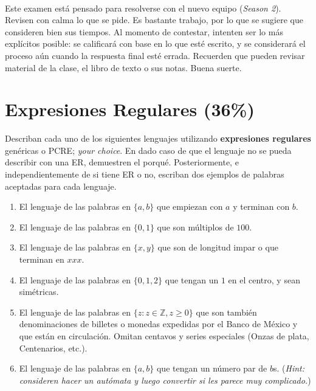 \documentclass[8pt, onside]{article}
\title{
    \myclass \\
    \textbf{\mytitle} \\
    \myheader
    \date{}
}
\begin{document}
\maketitle

\vspace{-1.5cm}

Este examen está pensado para resolverse con el nuevo equipo (\textit{Season 2}).
Revisen con calma lo que se pide. Es bastante trabajo, por lo que se sugiere que consideren bien sus tiempos.
Al momento de contestar, intenten ser lo más explícitos posible: se calificará con base en lo que esté escrito, y se considerará el proceso aún cuando la respuesta final esté errada.
Recuerden que pueden revisar material de la clase, el libro de texto o sus notas.
Buena suerte.

\section{Expresiones Regulares (36\%)}

Describan cada uno de los siguientes lenguajes utilizando \textbf{expresiones regulares} genéricas o PCRE; \textit{your choice}. En dado caso de que el lenguaje no se pueda describir con una ER, demuestren el porqué. Posteriormente, e independientemente de si tiene ER o no, escriban dos ejemplos de palabras aceptadas para cada lenguaje.

\begin{enumerate}[label=\tt \alph*)]
    \itemsep0em
    \item El lenguaje de las palabras en $\{a,b\}$ que empiezan con $a$ y terminan con $b$.
    \item El lenguaje de las palabras en $\{0,1\}$ que son múltiplos de $100$.
    \item El lenguaje de las palabras en $\{x, y\}$ que son de longitud impar o que terminan en $xxx$.
    \item El lenguaje de las palabras en $\{0,1,2\}$ que tengan un $1$ en el centro, y sean simétricas.
    \item El lenguaje de las palabras en $\{z : z \in \mathbb{Z}, z \geq 0\}$ que son también denominaciones de billetes o monedas expedidas por el Banco de México y que están en circulación. Omitan centavos y series especiales (Onzas de plata, Centenarios, etc.).
    \item El lenguaje de las palabras en $\{a,b\}$ que tengan un número par de $b$s. (\textit{Hint: consideren hacer un autómata y luego convertir si les parece muy complicado.})
\end{enumerate}
\end{document}
